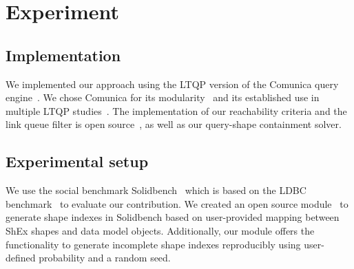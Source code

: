 \section{Experiment}




\subsection{Implementation}
We implemented our approach using the LTQP version of the Comunica query engine~\cite{taelman_iswc_resources_comunica_2018}. 
We chose Comunica for its modularity~\cite{taelman_swj_componentsjs_2022} and its established use in multiple LTQP studies~\cite{Bogaerts2021LinkTW, Taelman2023, eschauzier_quweda_linkqueue_2023, Hanski2024, eschauzier_amw_rcubemetric_2024, tam2024opportunitiesshapebasedoptimizationlink}.
The implementation of our reachability criteria and the link queue filter is open source~, as well as our query-shape containment solver.~

\subsection{Experimental setup}
We use the social benchmark Solidbench~\cite{Taelman2023} which is based on the LDBC benchmark~\cite{Angles2020} to evaluate our contribution.
We created an open source module~ to generate shape indexes in Solidbench based on user-provided mapping between ShEx shapes and data model objects.
Additionally, our module offers the functionality to generate incomplete shape indexes reproducibly using user-defined probability and a random seed.

